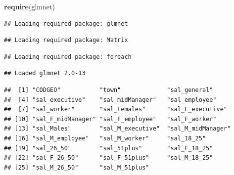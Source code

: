 \documentclass[]{article}
\newenvironment{Shaded}{\begin{snugshade}}{\end{snugshade}}
\newcommand{\KeywordTok}[1]{\textcolor[rgb]{0.13,0.29,0.53}{\textbf{#1}}}
\newcommand{\DecValTok}[1]{\textcolor[rgb]{0.00,0.00,0.81}{#1}}
\newcommand{\StringTok}[1]{\textcolor[rgb]{0.31,0.60,0.02}{#1}}
\newcommand{\CommentTok}[1]{\textcolor[rgb]{0.56,0.35,0.01}{\textit{#1}}}
\newcommand{\OperatorTok}[1]{\textcolor[rgb]{0.81,0.36,0.00}{\textbf{#1}}}
\newcommand{\NormalTok}[1]{#1}
\begin{document}
\begin{Shaded}
\begin{Highlighting}[]
\KeywordTok{require}\NormalTok{(glmnet)}
\end{Highlighting}
\end{Shaded}

\begin{verbatim}
## Loading required package: glmnet
\end{verbatim}

\begin{verbatim}
## Loading required package: Matrix
\end{verbatim}

\begin{verbatim}
## Loading required package: foreach
\end{verbatim}

\begin{verbatim}
## Loaded glmnet 2.0-13
\end{verbatim}

\begin{Shaded}
\end{Shaded}

\begin{verbatim}
##  [1] "CODGEO"           "town"             "sal_general"     
##  [4] "sal_executive"    "sal_midManager"   "sal_employee"    
##  [7] "sal_worker"       "sal_Females"      "sal_F_executive" 
## [10] "sal_F_midManager" "sal_F_employee"   "sal_F_worker"    
## [13] "sal_Males"        "sal_M_executive"  "sal_M_midManager"
## [16] "sal_M_employee"   "sal_M_worker"     "sal_18_25"       
## [19] "sal_26_50"        "sal_51plus"       "sal_F_18_25"     
## [22] "sal_F_26_50"      "sal_F_51plus"     "sal_M_18_25"     
## [25] "sal_M_26_50"      "sal_M_51plus"
\end{verbatim}

\begin{Shaded}
\end{Shaded}
\end{document}

